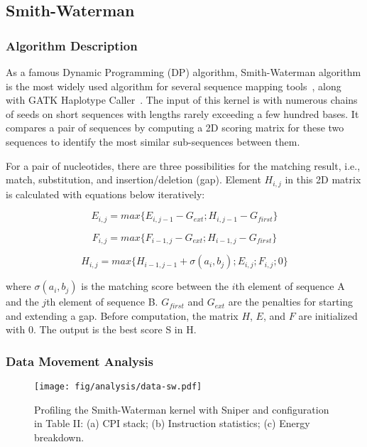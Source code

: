 \subsection{Smith-Waterman}
\subsubsection{Algorithm Description}
As a famous Dynamic Programming (DP) algorithm, Smith-Waterman algorithm is the most widely used algorithm for several sequence mapping tools~\cite{bwt}, along with GATK Haplotype Caller~\cite{gatk-queue}. The input of this kernel is with numerous chains of seeds on short sequences with lengths rarely exceeding a few hundred bases. It compares a pair of sequences by computing a 2D scoring matrix for these two sequences to identify the most similar sub-sequences between them.

For a pair of nucleotides, there are three possibilities for the matching result, i.e., match, substitution, and insertion/deletion (gap). Element $H_{i,j}$ in this 2D matrix is calculated with equations below iteratively:

\begin{equation}
    E_{i,j} = max\{E_{i,j-1} - G_{ext}; H_{i,j-1} - G_{first}\}
\end{equation}

\begin{equation}
    F_{i,j} = max\{F_{i-1,j} - G_{ext}; H_{i-1,j} - G_{first}\}
\end{equation}

\begin{equation}
    H_{i,j} = max\{H_{i-1,j-1} + \sigma(a_i,b_j); E_{i,j}; F_{i,j}; 0\}
\end{equation}

where $\sigma(a_i,b_j)$ is the matching score between the $i$th element of sequence A and the $j$th element of sequence B. $G_{first}$ and $G_{ext}$ are the penalties for starting and extending a gap. Before computation, the matrix $H$, $E$, and $F$ are initialized with 0. The output is the best score S in H.

\subsubsection{Data Movement Analysis}
\begin{figure}[htbp]
\centering
\texttt{[image: fig/analysis/data-sw.pdf]}
\caption{Profiling the Smith-Waterman kernel with Sniper and configuration in Table II: (a) CPI stack; (b) Instruction statistics; (c) Energy breakdown.}
\label{fig:data-sw}
\end{figure}

